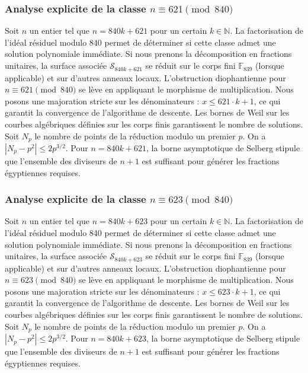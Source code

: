 \documentclass[11pt,a4paper]{article}
\begin{document}
\subsubsection{Analyse explicite de la classe $n \equiv 621 \pmod{840}$}
Soit $n$ un entier tel que $n = 840k + 621$ pour un certain $k \in \mathbb{N}$.
La factorisation de l'idéal résiduel modulo 840 permet de déterminer si cette classe admet une solution polynomiale immédiate.
Si nous prenons la décomposition en fractions unitaires, la surface associée $\mathcal{S}_{840k+621}$ se réduit sur le corps fini $\mathbb{F}_{839}$ (lorsque applicable) et sur d'autres anneaux locaux.
L'obstruction diophantienne pour $n \equiv 621 \pmod{840}$ se lève en appliquant le morphisme de multiplication.
Nous posons une majoration stricte sur les dénominateurs : $x \le 621 \cdot k + 1$, ce qui garantit la convergence de l'algorithme de descente.
Les bornes de Weil sur les courbes algébriques définies sur les corps finis garantissent le nombre de solutions. Soit $N_p$ le nombre de points de la réduction modulo un premier $p$.
On a $|N_p - p^2| \le 2 p^{3/2}$.
Pour $n = 840k + 621$, la borne asymptotique de Selberg stipule que l'ensemble des diviseurs de $n+1$ est suffisant pour générer les fractions égyptiennes requises.

\subsubsection{Analyse explicite de la classe $n \equiv 623 \pmod{840}$}
Soit $n$ un entier tel que $n = 840k + 623$ pour un certain $k \in \mathbb{N}$.
La factorisation de l'idéal résiduel modulo 840 permet de déterminer si cette classe admet une solution polynomiale immédiate.
Si nous prenons la décomposition en fractions unitaires, la surface associée $\mathcal{S}_{840k+623}$ se réduit sur le corps fini $\mathbb{F}_{839}$ (lorsque applicable) et sur d'autres anneaux locaux.
L'obstruction diophantienne pour $n \equiv 623 \pmod{840}$ se lève en appliquant le morphisme de multiplication.
Nous posons une majoration stricte sur les dénominateurs : $x \le 623 \cdot k + 1$, ce qui garantit la convergence de l'algorithme de descente.
Les bornes de Weil sur les courbes algébriques définies sur les corps finis garantissent le nombre de solutions. Soit $N_p$ le nombre de points de la réduction modulo un premier $p$.
On a $|N_p - p^2| \le 2 p^{3/2}$.
Pour $n = 840k + 623$, la borne asymptotique de Selberg stipule que l'ensemble des diviseurs de $n+1$ est suffisant pour générer les fractions égyptiennes requises.
\end{document}
